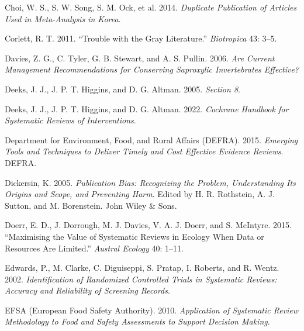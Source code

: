 \documentclass[
  letterpaper,
  DIV=11,
  numbers=noendperiod]{scrreprt}
\newlength{\cslhangindent}
\newenvironment{CSLReferences}[2] %
 {\begin{list}{}{%
  \setlength{\itemindent}{0pt}
  \setlength{\leftmargin}{0pt}
  \setlength{\parsep}{0pt}
  \ifodd #1
   \setlength{\leftmargin}{\cslhangindent}
   \setlength{\itemindent}{-1\cslhangindent}
  \fi
  \setlength{\itemsep}{#2\baselineskip}}}
 {\end{list}}
\begin{document}
\begin{CSLReferences}{1}{1}
Choi, W. S., S. W. Song, S. M. Ock, et al. 2014. \emph{Duplicate
Publication of Articles Used in Meta-Analysis in Korea}.

Corlett, R. T. 2011. {``Trouble with the Gray Literature.''}
\emph{Biotropica} 43: 3--5.

Davies, Z. G., C. Tyler, G. B. Stewart, and A. S. Pullin. 2006.
\emph{Are Current Management Recommendations for Conserving Saproxylic
Invertebrates Effective?}

Deeks, J. J., J. P. T. Higgins, and D. G. Altman. 2005. \emph{Section
8}.

Deeks, J. J., J. P. T. Higgins, and D. G. Altman. 2022. \emph{Cochrane
Handbook for Systematic Reviews of Interventions}.

Department for Environment, Food, and Rural Affairs (DEFRA). 2015.
\emph{Emerging Tools and Techniques to Deliver Timely and Cost Effective
Evidence Reviews}. DEFRA.

Dickersin, K. 2005. \emph{Publication Bias: Recognizing the Problem,
Understanding Its Origins and Scope, and Preventing Harm}. Edited by H.
R. Rothstein, A. J. Sutton, and M. Borenstein. John Wiley \& Sons.

Doerr, E. D., J. Dorrough, M. J. Davies, V. A. J. Doerr, and S.
McIntyre. 2015. {``Maximising the Value of Systematic Reviews in Ecology
When Data or Resources Are Limited.''} \emph{Austral Ecology} 40: 1--11.

Edwards, P., M. Clarke, C. Diguiseppi, S. Pratap, I. Roberts, and R.
Wentz. 2002. \emph{Identification of Randomized Controlled Trials in
Systematic Reviews: Accuracy and Reliability of Screening Records}.

EFSA (European Food Safety Authority). 2010. \emph{Application of
Systematic Review Methodology to Food and Safety Assessments to Support
Decision Making}.


\end{CSLReferences}
\end{document}

